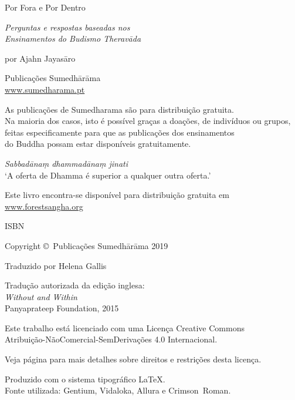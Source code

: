 \cleartoverso
\thispagestyle{empty}

{\copyrightsize
\centering
\setlength{\parindent}{0pt}%
\setlength{\parskip}{0.8\baselineskip}%

Por Fora e Por Dentro

\emph{Perguntas e respostas baseadas nos\\
Ensinamentos do Budismo Theravāda}

por Ajahn Jayasāro

Publicações Sumedhārāma\\
\href{http://sumedharama.pt}{www.sumedharama.pt}

As publicações de Sumedharama são para distribuição gratuita.\\ 
Na maioria dos casos, isto é possível graças a doações, 
de indivíduos ou grupos,\\
feitas especificamente para que as publicações dos ensinamentos\\
do Buddha possam estar disponíveis gratuitamente.

\textit{Sabbadānaṃ dhammadānaṃ jinati}\\
`A oferta de Dhamma é superior a qualquer outra oferta.'

Este livro encontra-se disponível para distribuição gratuita em\\
\href{http://forestsangha.org/}{www.forestsangha.org}

ISBN \theISBN

Copyright \copyright\ Publicações Sumedhārāma 2019

Traduzido por Helena Gallis

Tradução autorizada da edição inglesa:\\
\emph{Without and Within}\\
Panyaprateep Foundation, 2015

\vfill

{\footnotesize

Este trabalho está licenciado com uma Licença Creative Commons\\
Atribuição-NãoComercial-SemDerivações 4.0 Internacional.

Veja página \pageref{copyright-details} para mais detalhes sobre direitos e restrições desta licença.

Produzido com o sistema tipográfico \LaTeX.\\
Fonte utilizada: Gentium, Vidaloka, Allura e Crimson~Roman.

\theEditionInfo

}}
